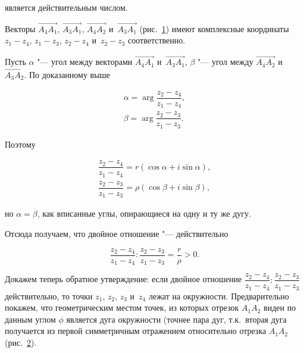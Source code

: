 \noindent
является действительным числом.

Векторы $\overrightarrow{A_{4}A_{1}}$, $\overrightarrow{A_{3}A_{1}}$,
$\overrightarrow{A_{4}A_{2}}$ и~$\overrightarrow{A_{3}A_{1}}$
(рис.\ \ref{fig:7_2_14}) имеют комплексные координаты
$z_{1} - z_{4}$, $z_{1} - z_{3}$, $z_{2} - z_{4}$ и~$z_{2} - z_{3}$
соответственно.

\begin{figure}\label{fig:7_2_14}
\end{figure}

Пусть $\alpha$ "--- угол между векторами $\overrightarrow{A_{4}A_{1}}$
и~$\overrightarrow{A_{3}A_{1}}$, $\beta$ "--- угол между
$\overrightarrow{A_{4}A_{2}}$ и~$\overrightarrow{A_{3}A_{2}}$.
По доказанному выше

\begin{gather*}
\alpha = \arg \dfrac{z_{2} - z_{4}}{z_{1} - z_{4}}, \\
\beta = \arg \dfrac{z_{2} - z_{3}}{z_{1} - z_{3}}.
\end{gather*}

\noindent
Поэтому

\begin{gather*}
\dfrac{z_{2} - z_{4}}{z_{1} - z_{4}} = r(\cos \alpha + i\sin \alpha), \\
\dfrac{z_{2} - z_{3}}{z_{1} - z_{3}} = \rho(\cos \beta + i\sin \beta),
\end{gather*}

\noindent
но $\alpha = \beta$, как вписанные углы, опирающиеся на одну и ту же дугу.

Отсюда получаем, что двойное отношение "--- действительно

\begin{equation*}
\dfrac{z_{2} - z_{4}}{z_{1} - z_{4}}
:
\dfrac{z_{2} - z_{3}}{z_{1} - z_{3}} = \dfrac{r}{\rho} > 0.
\end{equation*}
	
\noindent
Докажем теперь обратное утверждение: если двойное отношение
$\dfrac{z_{2} - z_{4}}{z_{1} - z_{4}} :
\dfrac{z_{2} - z_{3}}{z_{1} - z_{3}}$ действительно, то точки
$z_{1}$, $z_{2}$, $z_{3}$ и~$z_{4}$ лежат на окружности.
Предварительно покажем, что геометрическим местом точек, из которых
отрезок $A_{1}A_{2}$ виден по данным углом $\phi$ является дуга окружности
(точнее пара дуг, т.к.\ вторая дуга получается из первой симметричным
отражением относительно отрезка $A_{1}A_{2}$ (рис.\ \ref{fig:7_2_15}).

\begin{figure}\label{fig:7_2_15}
\end{figure}

